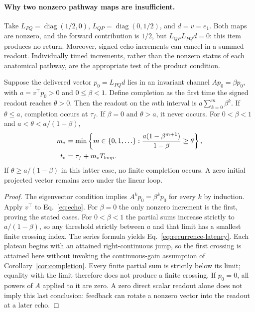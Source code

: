 \paragraph{Why two nonzero pathway maps are insufficient.} Take $L_{PQ}=\operatorname{diag}(1/2,0)$, $L_{QP}=\operatorname{diag}(0,1/2)$, and $d=v=e_1$. Both maps are nonzero, and the forward contribution is $1/2$, but $L_{QP}L_{PQ}d=0$: this item produces no return. Moreover, signed echo increments can cancel in a summed readout. Individually timed increments, rather than the nonzero status of each anatomical pathway, are the appropriate test of the product condition.

\begin{corollary}\label{cor:recurrence}
Suppose the delivered vector $p_0=L_{PQ}d$ lies in an invariant channel $Ap_0=\beta p_0$, with $a=v^\top p_0>0$ and $0\le\beta<1$. Define completion as the first time the signed readout reaches $\theta>0$. Then the readout on the $m$th interval is $a\sum_{k=0}^{m}\beta^k$. If $\theta\le a$, completion occurs at $\tau_f$. If $\beta=0$ and $\theta>a$, it never occurs. For $0<\beta<1$ and $a<\theta<a/(1-\beta)$,
\begin{align}
m_*&=\min\left\{m\in\{0,1,\ldots\}:\frac{a(1-\beta^{m+1})}{1-\beta}\ge\theta\right\},\nonumber\\
t_*&=\tau_f+m_*T_{\rm loop}.\label{eq:recurrence-latency}
\end{align}
If $\theta\ge a/(1-\beta)$ in this latter case, no finite completion occurs. A zero initial projected vector remains zero under the linear loop.
\end{corollary}
\begin{proof}
The eigenvector condition implies $A^kp_0=\beta^kp_0$ for every $k$ by induction. Apply $v^\top$ to Eq.~\eqref{eq:echo}. For $\beta=0$ the only nonzero increment is the first, proving the stated cases. For $0<\beta<1$ the partial sums increase strictly to $a/(1-\beta)$, so any threshold strictly between $a$ and that limit has a smallest finite crossing index. The series formula yields Eq.~\eqref{eq:recurrence-latency}. Each plateau begins with an attained right-continuous jump, so the first crossing is attained here without invoking the continuous-gain assumption of Corollary~\ref{cor:completion}. Every finite partial sum is strictly below its limit; equality with the limit therefore does not produce a finite crossing. If $p_0=0$, all powers of $A$ applied to it are zero. A zero direct scalar readout alone does not imply this last conclusion: feedback can rotate a nonzero vector into the readout at a later echo.
\end{proof}

